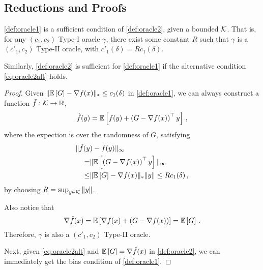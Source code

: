\subsection{Reductions and Proofs}
\label{sec:orrel}

\begin{theorem}\label{thm:typered}
\cref{def:oracle1} is a sufficient condition of \cref{def:oracle2}, given a bounded $\mathcal{K}$. That is, for any $(c_1,c_2)$ Type-I oracle $\gamma$, there exist some constant $R$ such that  $\gamma$ is a $(c'_1,c_2)$ Type-II oracle, with $c'_1(\delta)=Rc_1(\delta)$.

Similarly, \cref{def:oracle2} is sufficient for \cref{def:oracle1} if the alternative condition \eqref{eq:oracle2alt} holds.
\end{theorem}
\begin{proof}
Given $\| \mathbb{E}\left[G\right]  - \nabla f(x)  \|_* \le c_1(\delta) $ in \cref{def:oracle1}, we can always construct a function $\tilde{f}:\mathcal{K} \to \mathbb{R}$, 
\[
\tilde{f}(y) =\mathbb{E}\left[ f(y)+ \left( G-\nabla f(x) \right)^\top y\right] \,, 
\]
where the expection is over the randomness of $G$, satisfying
\begin{align*}
\MoveEqLeft
\norm{\tilde{f}(y)-f(y)}_{\infty} \\
= &
 \norm{ \EE{\left( G-\nabla f(x) \right)^\top y}}_{\infty}\\
 \le &\norm{\EE{G}-\nabla f(x)}_* \norm{y}
 \le  Rc_1(\delta)\,,
\end{align*} 
by choosing $R = \sup_{y \in \mathcal{K}}\|y\|$.

Also notice that
\[
 \nabla \tilde{f}(x) = \mathbb{E}\left[\nabla f(x)+ \left( G-\nabla f(x)\right)\right]
 =\mathbb{E}\left[G\right]\,.
\]
Therefore, $\gamma$ is also a $(c'_1,c_2)$ Type-II oracle.

Next, given \eqref{eq:oracle2alt} and $\mathbb{E}\left[G\right]=\nabla \tilde{f}(x)$ in \cref{def:oracle2}, we can immediately get the bias condition of \cref{def:oracle1}. 
\end{proof}

